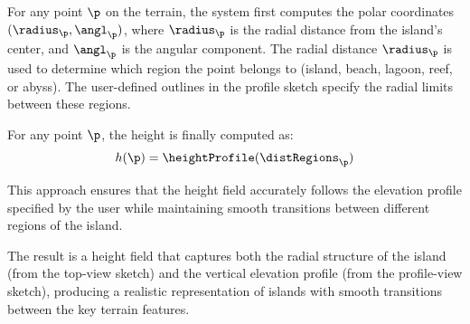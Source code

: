 For any point $\p$ on the terrain, the system first computes the polar coordinates $(\radius_\p, \angl_\p)$, where $\radius_\p$ is the radial distance from the island's center, and $\angl_\p$ is the angular component. The radial distance $\radius_\p$ is used to determine which region the point belongs to (island, beach, lagoon, reef, or abyss). The user-defined outlines in the profile sketch specify the radial limits between these regions.


For any point $\p$, the height is finally computed as:
\begin{align}
    h(\p) = \heightProfile(\distRegions_\p)
\end{align}

This approach ensures that the height field accurately follows the elevation profile specified by the user while maintaining smooth transitions between different regions of the island.

The result is a height field that captures both the radial structure of the island (from the top-view sketch) and the vertical elevation profile (from the profile-view sketch), producing a realistic representation of islands with smooth transitions between the key terrain features.






